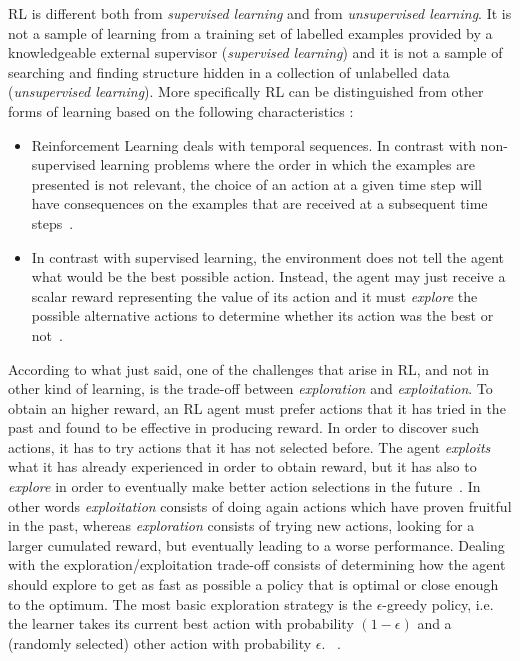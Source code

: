 RL is different both from \textit{supervised learning} and from \textit{unsupervised learning}. It is not a sample of learning from a training set of labelled examples provided by a knowledgeable external supervisor (\textit{supervised learning}) and it is not a sample of searching and finding structure hidden in a collection of unlabelled data (\textit{unsupervised learning}). More specifically RL can be distinguished from other forms of learning based on the following characteristics :

\begin{itemize}
	\item Reinforcement Learning deals with temporal sequences. In contrast with non-supervised learning problems where the order in which the examples are presented is not relevant, the choice of an action at a given time step will have consequences on the examples that are received at a subsequent time steps~\cite{Sigaud:2010:MDP:1841781}.
	\item In contrast with supervised learning, the environment does not tell the agent what would be the best possible action. Instead, the agent may just receive a scalar reward representing the value of its action and it must \textit{explore} the possible alternative actions to determine whether its action was the best or not~\cite{Sigaud:2010:MDP:1841781}.
\end{itemize}

According to what just said, one of the challenges that arise in RL, and not in other kind of learning, is the trade-off between \textit{exploration} and \textit{exploitation}. To obtain an higher reward, an RL agent must prefer actions that it has tried in the past and found to be effective in producing reward. In order to discover such actions, it has to try actions that it has not selected before. The agent \textit{exploits} what it has already experienced in order to obtain reward, but it has also to \textit{explore} in order to eventually make better action selections in the future~\cite{SuttonBarto}. In other words \textit{exploitation} consists of doing again actions which have proven fruitful in the past, whereas \textit{exploration} consists of trying new actions, looking for a larger cumulated reward, but eventually leading to a worse performance. Dealing with the exploration/exploitation trade-off consists of determining how the agent should explore to get as fast as possible a policy that is optimal or close enough to the optimum. The most basic exploration strategy is the $\epsilon$-greedy policy, i.e. the learner takes its current best action with probability $(1-\epsilon)$ and a (randomly selected) other action with probability $\epsilon$. ~\cite{Sigaud:2010:MDP:1841781}. 

